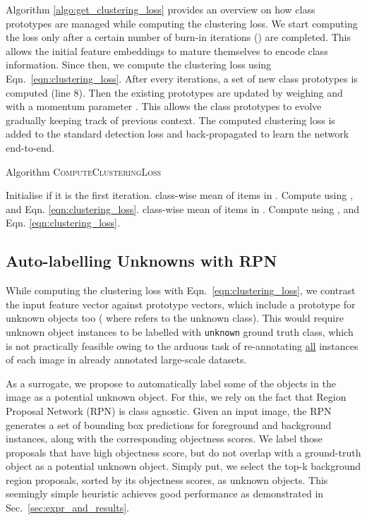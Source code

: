 \documentclass[final]{cvpr}
\newcommand{\cls}[1]{{\small\texttt{#1}}}
\begin{document}
Algorithm \ref{algo:get_clustering_loss} provides an overview on how class prototypes are managed while computing the clustering loss. We start computing the loss only after a certain number of burn-in iterations () are completed. This allows the initial feature embeddings to mature themselves to encode class information. Since then, we compute the clustering loss using Eqn.~\ref{eqn:clustering_loss}. After every  iterations, a set of new class prototypes  is computed (line 8). Then the existing prototypes  are updated by weighing  and  with a momentum parameter . This allows the class prototypes to evolve gradually keeping track of previous context. The computed clustering loss is added to the standard detection loss and back-propagated to learn the network end-to-end.


\begin{algorithm}\small
\caption{Algorithm \textsc{ComputeClusteringLoss}}
\label{algo:get_clustering_loss}
\begin{algorithmic}[1]
\State Initialise  if it is the first iteration.
\If{}
\State  class-wise mean of items in . 
\State   Compute using ,  and Eqn. \ref{eqn:clustering_loss}.  
\ElsIf{  }
 \If{}
 \State  class-wise mean of  items in . 
 \State 
 \EndIf
 \State   Compute using ,  and Eqn. \ref{eqn:clustering_loss}.
\EndIf
\State \Return 
\end{algorithmic}
\end{algorithm}

\subsection{Auto-labelling Unknowns with RPN}\label{sec:autolabelling_unknown}
While computing the clustering loss with Eqn.~\ref{eqn:clustering_loss}, we contrast the input feature vector  against prototype vectors, which include a prototype for unknown objects too (  where  refers to the unknown class). This would require unknown object instances to be labelled with \cls{unknown} ground truth class, which is not practically feasible owing to the arduous task of re-annotating \underline{all} instances of each image in already annotated large-scale datasets.

As a surrogate, we propose to automatically label some of the objects in the image as a potential unknown object. For this, we rely on the fact that Region Proposal Network (RPN) is class agnostic.
Given an input image, the RPN generates a set of bounding box predictions for foreground and background instances, along with the corresponding objectness scores.
We label those proposals that have high objectness score, but do not overlap with a ground-truth object as a potential unknown object. Simply put, we select the top-k background region proposals, sorted by its objectness scores, as unknown objects. 
This seemingly simple heuristic achieves good performance as demonstrated in Sec.~\ref{sec:expr_and_results}.
\end{document}
